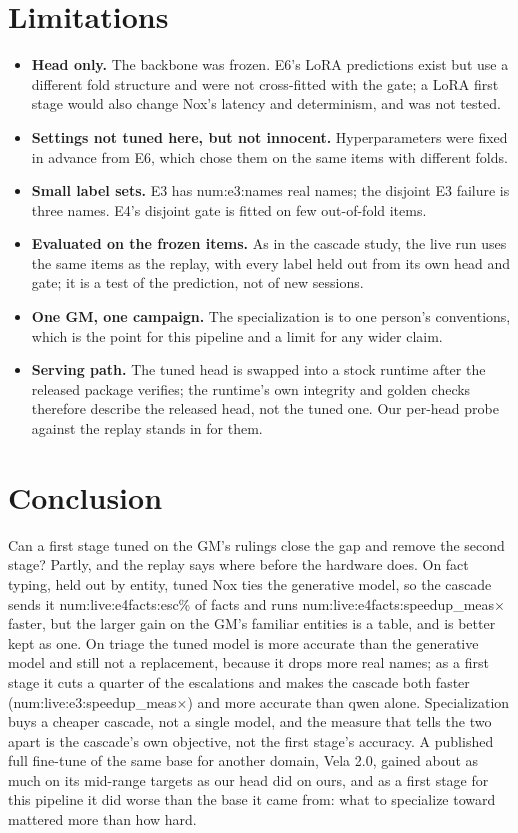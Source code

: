 \documentclass[11pt]{article}
\newcommand{\N}[1]{\csname num:#1\endcsname}
\begin{document}
\section{Limitations}
\begin{itemize}
  \item \textbf{Head only.} The backbone was frozen. E6's LoRA predictions exist but use a different
        fold structure and were not cross-fitted with the gate; a LoRA first stage would also change
        Nox's latency and determinism, and was not tested.
  \item \textbf{Settings not tuned here, but not innocent.} Hyperparameters were fixed in advance from
        E6, which chose them on the same items with different folds.
  \item \textbf{Small label sets.} E3 has \N{e3:names} real names; the disjoint E3 failure is three
        names. E4's disjoint gate is fitted on few out-of-fold items.
  \item \textbf{Evaluated on the frozen items.} As in the cascade study, the live run uses the same
        items as the replay, with every label held out from its own head and gate; it is a test of the
        prediction, not of new sessions.
  \item \textbf{One GM, one campaign.} The specialization is to one person's conventions, which is
        the point for this pipeline and a limit for any wider claim.
  \item \textbf{Serving path.} The tuned head is swapped into a stock runtime after the released
        package verifies; the runtime's own integrity and golden checks therefore describe the released
        head, not the tuned one. Our per-head probe against the replay stands in for them.
\end{itemize}

\section{Conclusion}
Can a first stage tuned on the GM's rulings close the gap and remove the second stage? Partly, and
the replay says where before the hardware does. On fact typing, held out by entity, tuned Nox ties
the generative model, so the cascade sends it \N{live:e4facts:esc}\% of facts and runs
\N{live:e4facts:speedup_meas}$\times$ faster, but the larger gain on the GM's familiar entities is a
table, and is better kept as one. On triage the tuned model is more accurate than the generative
model and still not a replacement, because it drops more real names; as a first stage it cuts a
quarter of the escalations and makes the cascade both faster (\N{live:e3:speedup_meas}$\times$) and
more accurate than qwen alone. Specialization buys a cheaper cascade, not a single model, and the
measure that tells the two apart is the cascade's own objective, not the first stage's accuracy.
A published full fine-tune of the same base for another domain, Vela 2.0, gained about as much on
its mid-range targets as our head did on ours, and as a first stage for this pipeline it did worse
than the base it came from: what to specialize toward mattered more than how hard.
\end{document}
